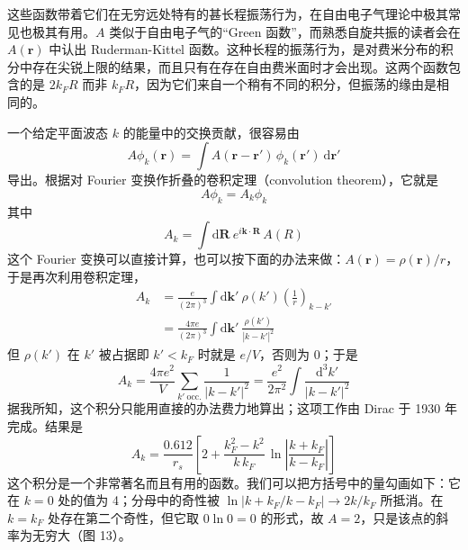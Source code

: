 这些函数带着它们在无穷远处特有的甚长程振荡行为，在自由电子气理论中极其常见也极其有用。$A$ 类似于自由电子气的“Green 函数”，而熟悉自旋共振的读者会在 $A(\mathbf{r})$ 中认出 Ruderman-Kittel 函数。这种长程的振荡行为，是对费米分布的积分中存在尖锐上限的结果，而且只有在存在自由费米面时才会出现。这两个函数包含的是 $2k_F R$ 而非 $k_F R$，因为它们来自一个稍有不同的积分，但振荡的缘由是相同的。

一个给定平面波态 $k$ 的能量中的交换贡献，很容易由
\begin{equation*}
A\phi_k(\mathbf{r}) = \int A(\mathbf{r}-\mathbf{r}')\,\phi_k(\mathbf{r}')\ \mathrm{d}\mathbf{r}'
\end{equation*}
导出。根据对 Fourier 变换作折叠的卷积定理（convolution theorem），它就是
\begin{equation*}
A\phi_k = A_k\phi_k
\end{equation*}
其中
\begin{equation*}
A_k = \int \mathrm{d}\mathbf{R}\ e^{i\mathbf{k}\cdot\mathbf{R}}\,A(R)
\end{equation*}
这个 Fourier 变换可以直接计算，也可以按下面的办法来做：$A(\mathbf{r}) = \rho(\mathbf{r})/r$，于是再次利用卷积定理，
\begin{align*}
A_k &= \frac{e}{(2\pi)^3}\int \mathrm{d}\mathbf{k}'\ \rho(k')\left(\frac{1}{r}\right)_{k-k'}\\
&= \frac{4\pi e}{(2\pi)^3}\int \mathrm{d}\mathbf{k}'\ \frac{\rho(k')}{|k-k'|^2}
\end{align*}
但 $\rho(k')$ 在 $k'$ 被占据即 $k' < k_F$ 时就是 $e/V$，否则为 0；于是
\begin{equation*}
A_k = \frac{4\pi e^2}{V}\sum_{k'\ \mathrm{occ.}}\frac{1}{|k-k'|^2} = \frac{e^2}{2\pi^2}\int\frac{\mathrm{d}^3k'}{|k-k'|^2}
\end{equation*}
据我所知，这个积分只能用直接的办法费力地算出；这项工作由 Dirac 于 1930 年完成。结果是
\begin{equation*}
A_k = \frac{0.612}{r_s}\left[2 + \frac{k_F^2 - k^2}{k\,k_F}\,\ln\left|\frac{k+k_F}{k-k_F}\right|\right]
\end{equation*}
这个积分是一个非常著名而且有用的函数。我们可以把方括号中的量勾画如下：它在 $k = 0$ 处的值为 4；分母中的奇性被 $\ln|k+k_F/k-k_F| \to 2k/k_F$ 所抵消。在 $k = k_F$ 处存在第二个奇性，但它取 $0\ln 0 = 0$ 的形式，故 $A = 2$，只是该点的斜率为无穷大（图 13）。

